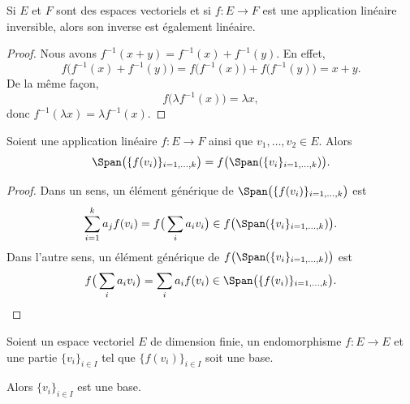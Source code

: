 \begin{lemma}       \label{LEMooRZDTooEuLTrO}
	Si \( E\) et \( F\) sont des espaces vectoriels et si \( f\colon E\to F\) est une application linéaire inversible, alors son inverse est également linéaire.
\end{lemma}

\begin{proof}
	Nous avons \( f^{-1}(x+y)=f^{-1}(x)+f^{-1}(y)\). En effet,
	\begin{equation}
		f\big( f^{-1}(x)+f^{-1}(y) \big)=f\big( f^{-1}(x) \big)+f\big( f^{-1}(y) \big)=x+y.
	\end{equation}
	De la même façon,
	\begin{equation}
		f\big( \lambda f^{-1}(x) \big)=\lambda x,
	\end{equation}
	donc \( f^{-1}(\lambda x)=\lambda f^{-1}(x)\).
\end{proof}

\begin{lemma}	\label{LEMooVGDDooRmUDUi}
	Soient une application linéaire \(f \colon E\to F  \) ainsi que \( v_1,\ldots,v_2\in E\). Alors
	\begin{equation}
		\Span\big( \{ f(v_i) \}_{i=1,\ldots,k} \big)=f\big( \Span(\{ v_i \}_{i=1,\ldots,k}) \big).
	\end{equation}
\end{lemma}

\begin{proof}
	Dans un sens, un élément générique de \( \Span\big( \{ f(v_i) \}_{i=1,\ldots,k} \big)\) est
	\begin{equation}
		\sum_{i=1}^ka_jf(v_i)=f\big( \sum_ia_iv_i \big)\in f\big( \Span(\{ v_i \}_{i=1,\ldots,k}) \big).
	\end{equation}
	Dans l'autre sens, un élément générique de \( f\big( \Span(\{ v_i \}_{i=1,\ldots,k}) \big)\) est
	\begin{equation}
		f\big( \sum_ia_iv_i \big)=\sum_ia_if(v_i)\in\Span\big( \{ f(v_i) \}_{i=1,\ldots,k} \big).
	\end{equation}
\end{proof}


\begin{proposition}     \label{PROPooHLUYooNsDgbn}
	Soient un espace vectoriel \( E\) de dimension finie, un endomorphisme \( f\colon E\to E\) et une partie \( \{v_i\}_{i\in I}\) tel que \( \{f(v_i)\}_{i\in I}\) soit une base.

	Alors \( \{v_i\}_{i\in I}\) est une base.
\end{proposition}

